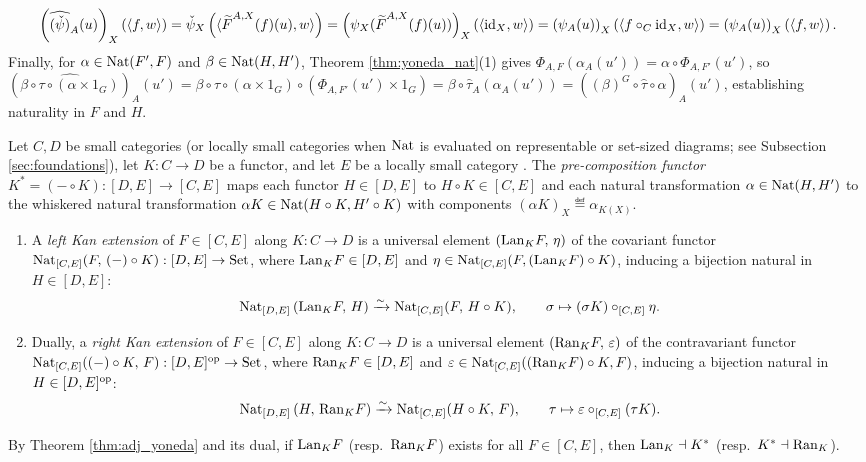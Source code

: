 \documentclass[10pt,a4paper]{article}
\begin{document}
\begin{enumerate}
\begin{itemize}
$$\left(\widehat{(\check{\psi})}_A(u)\right)_X\left(\langle f, w \rangle\right) = \check{\psi}_X\left(\langle {\widetilde{F}\textrm{}}^{A,X}(f)(u), w \rangle\right) = \left(\psi_X({\widetilde{F}\textrm{}}^{A,X}(f)(u))\right)_X\left(\langle {\textrm{id}}_X, w \rangle\right) = \left(\psi_A(u)\right)_X\left(\langle f \circ_C {\textrm{id}}_X, w \rangle\right) = \left(\psi_A(u)\right)_X\left(\langle f, w \rangle\right).$$
Finally, for $\alpha \in {\textrm{Nat}}(F', F)$ and $\beta \in {\textrm{Nat}}(H, H')$, Theorem \ref{thm:yoneda_nat}(1) gives $\Phi_{A,F}(\alpha_A(u')) = \alpha \circ \Phi_{A,F'}(u')$, so $(\widehat{\beta \circ \tau \circ (\alpha \times 1_G)})_{A}(u') = \beta \circ \tau \circ (\alpha \times 1_G) \circ (\Phi_{A,F'}(u') \times 1_G) = \beta \circ \widehat{\tau}_A(\alpha_A(u')) = ((\beta)^G \circ \widehat{\tau} \circ \alpha)_A(u')$, establishing naturality in $F$ and $H$.
\end{itemize}
\end{enumerate}
\myqed

\begin{definition}\label{def:kan_ext}
Let $C, D$ be small categories (or locally small categories when ${\textrm{Nat}}$ is evaluated on representable or set-sized diagrams; see Subsection \ref{sec:foundations}), let $K : C \to D$ be a functor, and let $E$ be a locally small category \cite{MacLane1998,Riehl2016,Kelly1982}. The \emph{pre-composition functor} $K^* = (- \circ K) : [D, E] \to [C, E]$ maps each functor $H \in [D, E]$ to $H \circ K \in [C, E]$ and each natural transformation $\alpha \in {\textrm{Nat}}(H, H')$ to the whiskered natural transformation $\alpha K \in {\textrm{Nat}}(H \circ K, H' \circ K)$ with components $(\alpha K)_X \eqdef \alpha_{K(X)}$.
\begin{enumerate}
\item A \emph{left Kan extension} of $F \in [C, E]$ along $K : C \to D$ is a universal element $({\mathrm{Lan}}_K F,\, \eta)$ of the covariant functor ${\textrm{Nat}}_{[C,E]}(F,\, (-) \circ K) : [D, E] \to {\textrm{Set}}$, where ${\mathrm{Lan}}_K F \in [D, E]$ and $\eta \in {\textrm{Nat}}_{[C,E]}(F, ({\mathrm{Lan}}_K F) \circ K)$, inducing a bijection natural in $H \in [D, E]$:
$${\textrm{Nat}}_{[D,E]}\left({\mathrm{Lan}}_K F,\, H\right) \xrightarrow{\sim} {\textrm{Nat}}_{[C,E]}(F,\, H \circ K), \qquad \sigma \mapsto (\sigma K) \circ_{[C,E]} \eta.$$
\item Dually, a \emph{right Kan extension} of $F \in [C, E]$ along $K : C \to D$ is a universal element $({\mathrm{Ran}}_K F,\, \varepsilon)$ of the contravariant functor ${\textrm{Nat}}_{[C,E]}((-) \circ K,\, F) : [D, E]^{\textrm{op}} \to {\textrm{Set}}$, where ${\mathrm{Ran}}_K F \in [D, E]$ and $\varepsilon \in {\textrm{Nat}}_{[C,E]}(({\mathrm{Ran}}_K F) \circ K, F)$, inducing a bijection natural in $H \in [D, E]^{\textrm{op}}$:
$${\textrm{Nat}}_{[D,E]}\left(H,\, {\mathrm{Ran}}_K F\right) \xrightarrow{\sim} {\textrm{Nat}}_{[C,E]}(H \circ K,\, F), \qquad \tau \mapsto \varepsilon \circ_{[C,E]} (\tau K).$$
\end{enumerate}
By Theorem \ref{thm:adj_yoneda} and its dual, if ${\mathrm{Lan}}_K F$ (resp.\ ${\mathrm{Ran}}_K F$) exists for all $F \in [C, E]$, then ${\mathrm{Lan}}_K \dashv K^*$ (resp.\ $K^* \dashv {\mathrm{Ran}}_K$).
\end{definition}
\end{document}
